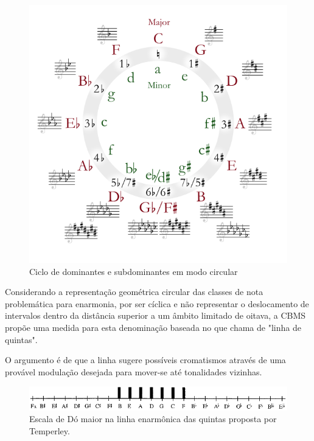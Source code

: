 \documentclass[
	12pt,				%
	openright,			%
	twoside,			%
	a4paper,			%
	english,			%
	french,				%
	spanish,			%
	brazil				%
	]{abntex2}
\begin{document}
\begin{figure}[!h]
	\caption{\label{fig_grafico}Ciclo de dominantes e subdominantes em modo circular }
	\begin{center}
	    \includegraphics[scale=0.6]{CBMS/quintas.png}
	\end{center}
\end{figure}


Considerando a representação geométrica circular das classes de nota problemática para enarmonia, por ser cíclica e não representar o deslocamento de intervalos dentro da distância superior a um âmbito limitado de oitava, a  CBMS propõe uma medida para esta denominação baseada no que chama de "linha de quintas".

O argumento é de que a linha sugere possíveis cromatismos através de uma provável modulação desejada para mover-se até tonalidades vizinhas.


\begin{figure}[!h]
	\caption{\label{fig_grafico}Escala de Dó maior na linha enarmônica das quintas proposta por Temperley. }
	\begin{center}
	    \includegraphics[scale=0.6]{CBMS/jonico_lineoffifths.png}
	\end{center}
\end{figure}
\end{document}
